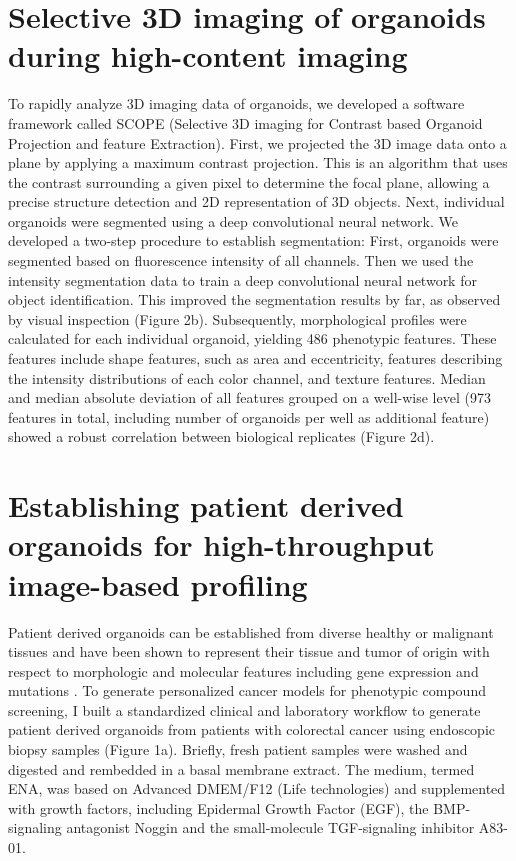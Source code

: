 \begin{flushleft}
\section{Selective 3D imaging of organoids during high-content imaging}
To rapidly analyze 3D imaging data of organoids, we developed a software framework called SCOPE (Selective 3D imaging for Contrast based Organoid Projection and feature Extraction). 
First, we projected the 3D image data onto a plane by applying a maximum contrast projection. 
This is an algorithm that uses the contrast surrounding a given pixel to determine the focal plane, allowing a precise structure detection and 2D representation of 3D objects. 
Next, individual organoids were segmented using a deep convolutional neural network. We developed a two-step procedure to establish segmentation: First, organoids were segmented based on fluorescence intensity of all channels. 
Then we used the intensity segmentation data to train a deep convolutional neural network for object identification. 
This improved the segmentation results by far, as observed by visual inspection (Figure 2b).
Subsequently, morphological profiles were calculated for each individual organoid, yielding 486 phenotypic features. 
These features include shape features, such as area and eccentricity, features describing the intensity distributions of each color channel, and texture features. 
Median and median absolute deviation of all features grouped on a well-wise level (973 features in total, including number of organoids per well as additional feature) showed a robust correlation between biological replicates (Figure 2d).


\section{Establishing patient derived organoids for high-throughput image-based profiling}

Patient derived organoids can be established from diverse healthy or malignant tissues and have been shown to represent their tissue and tumor of origin with respect to morphologic and molecular features including gene expression and mutations \cite{Fujii:2016jo, Weeber2015-sn, Van_De_Wetering2015-ko, Sato:2011-1h,  Broutier2017-wg}. To generate personalized cancer models for phenotypic compound screening, I built a standardized clinical and laboratory workflow to generate patient derived organoids from patients with colorectal cancer using endoscopic biopsy samples (Figure 1a). Briefly, fresh patient samples were washed and digested and rembedded in a basal membrane extract. The medium, termed ENA, was based on Advanced DMEM/F12 (Life technologies) and supplemented with growth factors, including Epidermal Growth Factor (EGF), the BMP-signaling antagonist Noggin and the small-molecule TGF\beta-signaling inhibitor A83-01. 


\end{flushleft}
